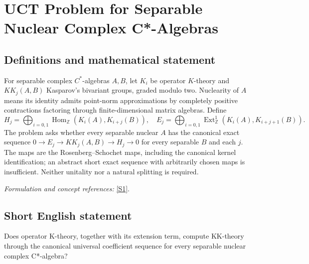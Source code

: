 \documentclass[11pt,a4paper]{article}
\newcommand{\Z}{\mathbb{Z}}
\newcommand{\sref}[2]{\hyperlink{source:#1:#2}{[S#2]}}
\newif\ifshowcatalogue
\newcommand{\cataloguescope}[1]{\ifshowcatalogue
 \paragraph{Exact scope in the supplied catalogue.}
 \begin{quote}\small #1\end{quote}\fi}
\begin{document}
\setcounter{section}{0}
\clearpage
\section*{\texorpdfstring{UCT Problem for Separable Nuclear Complex C*-Algebras}{UCT Problem for Separable Nuclear Complex C*-Algebras}}\label{statement}
\subsection{Definitions and mathematical statement}
For separable complex $C^*$-algebras $A,B$, let $K_i$ be operator $K$-theory and $KK_j(A,B)$ Kasparov's bivariant groups, graded modulo two. Nuclearity of $A$ means its identity admits point-norm approximations by completely positive contractions factoring through finite-dimensional matrix algebras. Define
\[
 H_j=\bigoplus_{i=0,1}\operatorname{Hom}_{\Z}(K_i(A),K_{i+j}(B)),\quad
 E_j=\bigoplus_{i=0,1}\operatorname{Ext}^1_{\Z}(K_i(A),K_{i+j+1}(B)).
\]
The problem asks whether every separable nuclear $A$ has the canonical exact sequence
$0\to E_j\to KK_j(A,B)\to H_j\to0$ for every separable $B$ and each $j$. The maps are the Rosenberg--Schochet maps, including the canonical kernel identification; an abstract short exact sequence with arbitrarily chosen maps is insufficient. Neither unitality nor a natural splitting is required.
\par\smallskip\textit{Formulation and concept references:} \sref{statement}{1}.
\cataloguescope{Decide whether EVERY separable nuclear complex C*-algebra A, unital or nonunital, satisfies the Rosenberg-Schochet UCT: for EVERY separable complex C*-algebra B, unital or nonunital, and each j in Z/2, the canonical UCT sequence 0 -> E\_j(A,B) -> KK\_j(A,B) -> H\_j(A,B) -> 0 is exact. Here H\_j(A,B)=direct\_sum\_(i=0,1) Hom\_Z(K\_i(A),K\_(i+j)(B)) and E\_j(A,B)=direct\_sum\_(i=0,1) Ext\_Z\textasciicircum{}1(K\_i(A),K\_(i+j+1)(B)), with indices modulo2. The right map is the natural map on K-theory induced by KK classes; the left is the canonical inverse extension-class identification of the kernel, not an arbitrary chosen injection. No canonical or natural splitting is required. Equivalently, every such A belongs to the Rosenberg-Schochet bootstrap category of separable nuclear C*-algebras, or is KK-equivalent to a separable commutative complex C*-algebra.}
\subsection{Short English statement}
Does operator K-theory, together with its extension term, compute KK-theory through the canonical universal coefficient sequence for every separable nuclear complex C*-algebra?
\end{document}
